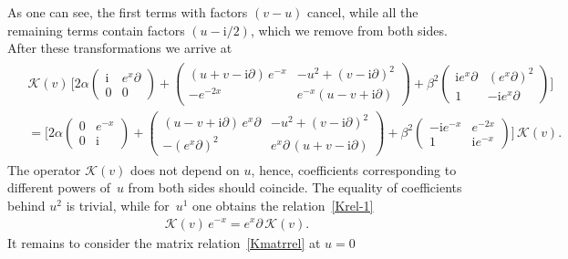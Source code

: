 \documentclass[11pt]{article}
\numberwithin{equation}{section}
\theoremstyle{plain}
\theoremstyle{definition}
\renewcommand{\imath}{\mathrm{i}}
\begin{document}
As one can see, the first terms with factors $(v - u)$ cancel, while all the remaining terms contain factors
$(u-\imath/2)$, which we remove from both sides. After these transformations we arrive at
\begin{align} \label{Kmatrrel}
	\begin{aligned}
		& \mathcal{K}(v)\,\Biggl[
		2\alpha 
		\begin{pmatrix}
			\imath & e^{x}\partial \\[4pt]
			0 & 0 \end{pmatrix} 
		+
		\begin{pmatrix}
			(u+v-\imath\partial) \, e^{-x} & -u^2+(v-\imath\partial)^2 \\[4pt]
			-e^{-2x} & e^{-x}(u-v+\imath\partial) \end{pmatrix} 
		+ \beta^2 \begin{pmatrix}
			\imath e^{x}\partial & (e^x\partial)^2 \\[4pt]
			1 & - \imath e^{x}\partial \end{pmatrix} \Biggr] \\[6pt]
		& = \Biggl[
		2\alpha
		\begin{pmatrix}
			0 & e^{-x} \\[4pt]
			0 & \imath \end{pmatrix}
		+ \begin{pmatrix}
			(u-v+\imath\partial) \, e^{x}\partial & -u^2+(v-\imath\partial)^2 \\[4pt]
			-(e^{x}\partial)^2 & e^{x}\partial\,(u+v-\imath\partial) \end{pmatrix}
		+ \beta^2
		\begin{pmatrix}
			- \imath e^{-x} & e^{-2x} \\[4pt]
			1 & \imath e^{-x} \end{pmatrix} \Biggr]
		\,\mathcal{K}(v).
	\end{aligned}
\end{align}
The operator $\mathcal{K}(v)$ does not depend on $u$, hence, coefficients corresponding to different powers of~$u$ from both sides should coincide. The equality of coefficients behind $u^2$ is trivial, while for~$u^1$ one obtains the relation~\eqref{Krel-1}
\begin{align}\label{u}
\mathcal{K}(v)\,e^{-x} = e^{x} \partial\,\mathcal{K}(v).
\end{align}
It remains to consider the matrix relation~\eqref{Kmatrrel} at $u=0$
\end{document}
